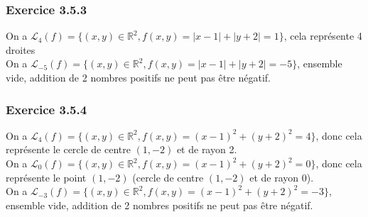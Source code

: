 \documentclass[]{book}
\theoremstyle{definition}
\newcommand{\bb}[1]{\mathbb{#1}}
\newcommand{\R}{\bb{R}}
\begin{document}
\begin{center}
\end{center}

\subsubsection*{Exercice 3.5.3}
On a $\mathscr{L}_{4}(f) = \{ (x,y) \in \R^2, f(x,y) = |x-1|+|y+2| = 1\}$, cela repr\'esente 4 droites\\
On a $\mathscr{L}_{-5}(f) = \{ (x,y) \in \R^2, f(x,y) = |x-1|+|y+2| = -5\}$, ensemble vide, addition de 2 nombres positifs ne peut pas \^etre n\'egatif.\\

\begin{center}
\end{center}


\subsubsection*{Exercice 3.5.4}
On a $\mathscr{L}_{4}(f) = \{ (x,y) \in \R^2, f(x,y) = (x-1)^2+(y+2)^2 = 4\}$, donc cela repr\'esente le cercle de centre $(1,-2)$ et de rayon 2.\\
On a $\mathscr{L}_{0}(f) = \{ (x,y) \in \R^2, f(x,y) = (x-1)^2+(y+2)^2 = 0\}$, donc cela repr\'esente le point $(1,-2)$ (cercle de centre $(1,-2)$ et de rayon 0).\\
On a $\mathscr{L}_{-3}(f) = \{ (x,y) \in \R^2, f(x,y) = (x-1)^2+(y+2)^2 = -3\}$, ensemble vide, addition de 2 nombres positifs ne peut pas \^etre n\'egatif.\\
\end{document}
